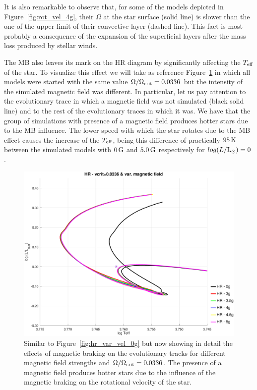 \documentclass[fleqn,usenatbib]{mnras}
\begin{document}
{{It is also remarkable to observe that, for some of the models depicted in Figure~\ref{fig:rot_vel_4g}, their $\Omega$ at the star surface (solid line) is slower than the one of the upper limit of their convective layer (dashed line). This fact is most probably a consequence of the expansion of the superficial layers after the mass loss produced by stellar winds.\par

The MB also leaves its mark on the HR diagram by significantly affecting the $T_{\mathrm{eff}}$ of the star. To visualize this effect we will take as reference Figure~\ref{hr_vc_0336_var_g_z1} in which all models were started with the same value $\Omega / \Omega_{\mathrm{crit}}=0.0336$ but the intensity of the simulated magnetic field was different. In particular, let us pay attention to the evolutionary trace in which a magnetic field was not simulated (black solid line) and to the rest of the evolutionary traces in which it was. We have that the group of simulations with presence of a magnetic field produces hotter stars due to the MB influence. The lower speed with which the star rotates due to the MB effect causes the increase of the $T_{\mathrm{eff}}$, being this difference of practically $95\,\mathrm{K}$ between the simulated models with $0\,\mathrm{G}$ and $5.0\,\mathrm{G}$ respectively for $log(L/\mathrm{L}_\odot)=0$.

\begin{figure}
	\includegraphics[trim = 30mm 15mm 15mm 15mm, clip,width=\columnwidth]{figures/hr_vc_0336_var_g_z1.eps}
    \caption{Similar to Figure~\ref{fig:hr_var_vel_0g} but now showing in detail the effects of magnetic braking on the evolutionary tracks for different magnetic field strengths and $\Omega / \Omega_{\mathrm{crit}}=0.0336$. The presence of a magnetic field produces hotter stars due to the influence of the magnetic braking on the rotational velocity of the star.}
    \label{hr_vc_0336_var_g_z1}
\end{figure}



}}
\end{document}
